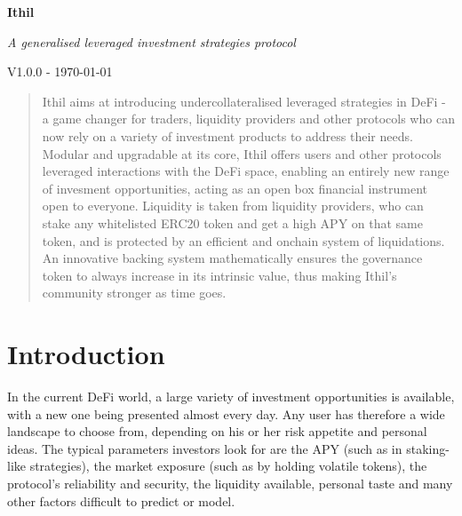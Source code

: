 \documentclass[a4paper,10 pt]{article}
\theoremstyle{definition}
\begin{document}
\begin{titlepage}
    \begin{center}
        \vspace*{1cm}
            
        \Huge
        \textbf{Ithil}

        \vspace{0.5cm}
        \Large
        {\it A generalised leveraged investment strategies protocol}

        \vspace{1.5cm}
        {\normalsize V1.0.0 - \today}
        \vspace{1.0cm}

        \begin{abstract}
        Ithil aims at introducing undercollateralised leveraged strategies in DeFi - a game changer for traders, liquidity providers and other protocols who can now rely on a variety of investment products to address their needs. Modular and upgradable at its core, Ithil offers users and other protocols leveraged interactions with the DeFi space, enabling an entirely new range of invesment opportunities, acting as an open box financial instrument open to everyone. Liquidity is taken from liquidity providers, who can stake any whitelisted ERC20 token and get a high APY on that same token, and is protected by an efficient and onchain system of liquidations. An innovative backing system mathematically ensures the governance token to always increase in its intrinsic value, thus making Ithil's community stronger as time goes.
        \end{abstract}
            
    \end{center}
\tableofcontents
\end{titlepage}

\section{Introduction}

In the current DeFi world, a large variety of investment opportunities is available, with a new one being presented almost every day. Any user has therefore a wide landscape to choose from, depending on his or her risk appetite and personal ideas. The typical parameters investors look for are the APY (such as in staking-like strategies), the market exposure (such as by holding volatile tokens), the protocol's reliability and security, the liquidity available, personal taste and many other factors difficult to predict or model.
\end{document}
